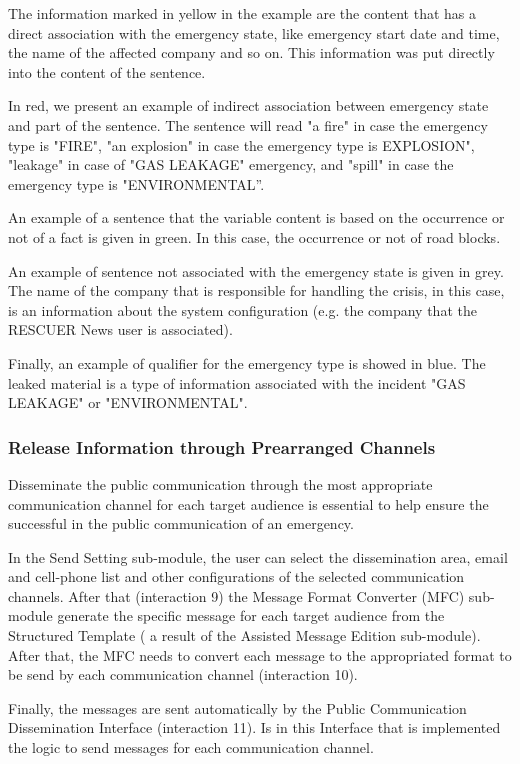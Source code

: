The information marked in yellow in the example are the content that has a direct association with the emergency state, like emergency start date and time, the name of the affected company and so on. This information was put directly into the content of the sentence.

In red, we present an example of indirect association between emergency state and part of the sentence. The sentence will read "a fire" in case the emergency type is "FIRE", "an explosion" in case the emergency type is EXPLOSION", "leakage" in case of "GAS LEAKAGE" emergency, and "spill" in case the emergency type is "ENVIRONMENTAL”. 

An example of a sentence that the variable content is based on the occurrence or not of a fact is given in green. In this case, the occurrence or not of road blocks. 

An example of sentence not associated with the emergency state is given in grey. The name of the company that is responsible for handling the crisis, in this case, is an information about the system configuration (e.g. the company that the RESCUER News user is associated).

Finally, an example of qualifier for the emergency type is showed in blue. The leaked material is a type of information associated with the incident "GAS LEAKAGE" or "ENVIRONMENTAL".



\subsubsection{Release Information through Prearranged Channels}



Disseminate the public communication through the most appropriate communication channel for each target audience is essential to help ensure the successful in the public communication of an emergency.

In the Send Setting sub-module, the user can select the dissemination area, email and cell-phone list and other configurations of the selected communication channels. After that (interaction 9) the Message Format Converter (MFC) sub-module generate the specific message for each target audience from the Structured Template ( a result of the Assisted Message Edition sub-module).  After that, the MFC needs to convert each message to the appropriated format to be send by each communication channel (interaction 10). 

Finally, the messages are sent automatically by the Public Communication Dissemination Interface (interaction 11). Is in this Interface that is implemented the logic to send messages for each communication channel. 

